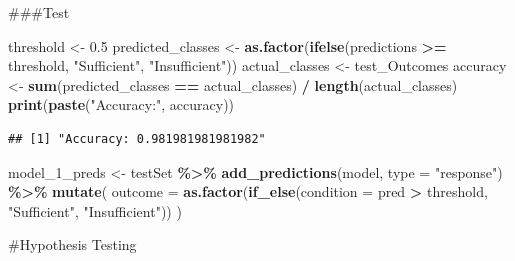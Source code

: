 \documentclass[
  11pt,
]{article}
\newenvironment{Shaded}{\begin{snugshade}}{\end{snugshade}}
\newcommand{\AttributeTok}[1]{\textcolor[rgb]{0.13,0.29,0.53}{#1}}
\newcommand{\FloatTok}[1]{\textcolor[rgb]{0.00,0.00,0.81}{#1}}
\newcommand{\FunctionTok}[1]{\textcolor[rgb]{0.13,0.29,0.53}{\textbf{#1}}}
\newcommand{\NormalTok}[1]{#1}
\newcommand{\OtherTok}[1]{\textcolor[rgb]{0.56,0.35,0.01}{#1}}
\newcommand{\SpecialCharTok}[1]{\textcolor[rgb]{0.81,0.36,0.00}{\textbf{#1}}}
\newcommand{\StringTok}[1]{\textcolor[rgb]{0.31,0.60,0.02}{#1}}
\begin{document}
\#\#\#Test

\begin{Shaded}
\begin{Highlighting}[]
\NormalTok{threshold }\OtherTok{\textless{}{-}} \FloatTok{0.5}  
\NormalTok{predicted\_classes }\OtherTok{\textless{}{-}} \FunctionTok{as.factor}\NormalTok{(}\FunctionTok{ifelse}\NormalTok{(predictions }\SpecialCharTok{\textgreater{}=}\NormalTok{ threshold, }\StringTok{"Sufficient"}\NormalTok{, }\StringTok{"Insufficient"}\NormalTok{))}
\NormalTok{actual\_classes }\OtherTok{\textless{}{-}}\NormalTok{ test\_Outcomes}
\NormalTok{accuracy }\OtherTok{\textless{}{-}} \FunctionTok{sum}\NormalTok{(predicted\_classes }\SpecialCharTok{==}\NormalTok{ actual\_classes) }\SpecialCharTok{/} \FunctionTok{length}\NormalTok{(actual\_classes)}
\FunctionTok{print}\NormalTok{(}\FunctionTok{paste}\NormalTok{(}\StringTok{"Accuracy:"}\NormalTok{, accuracy))}
\end{Highlighting}
\end{Shaded}

\begin{verbatim}
## [1] "Accuracy: 0.981981981981982"
\end{verbatim}

\begin{Shaded}
\begin{Highlighting}[]
\NormalTok{model\_1\_preds }\OtherTok{\textless{}{-}}\NormalTok{ testSet }\SpecialCharTok{\%\textgreater{}\%}
  \FunctionTok{add\_predictions}\NormalTok{(model, }\AttributeTok{type =} \StringTok{"response"}\NormalTok{) }\SpecialCharTok{\%\textgreater{}\%}
  \FunctionTok{mutate}\NormalTok{(}
    \AttributeTok{outcome =} \FunctionTok{as.factor}\NormalTok{(}\FunctionTok{if\_else}\NormalTok{(}\AttributeTok{condition =}\NormalTok{ pred }\SpecialCharTok{\textgreater{}}\NormalTok{ threshold, }
                      \StringTok{"Sufficient"}\NormalTok{, }\StringTok{"Insufficient"}\NormalTok{))}
\NormalTok{  )}
\end{Highlighting}
\end{Shaded}

\#Hypothesis Testing

\begin{Shaded}
\end{Shaded}
\end{document}
